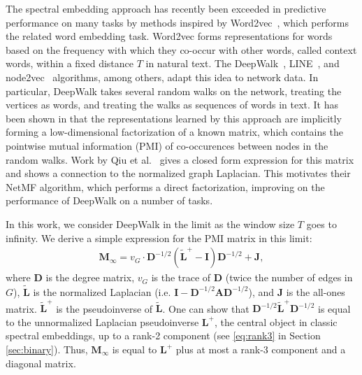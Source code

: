 \documentclass[sigconf]{acmart}
\newcommand{\mbf}[1]{\mathbf{#1}}
\newcommand{\bv}[1]{\mathbf{#1}}
\begin{document}
The spectral embedding approach has recently been exceeded in predictive performance on many tasks by methods inspired by Word2vec~\cite{mikolov2013distributed}, which performs the related word embedding task.
Word2vec forms representations for words based on the frequency with which they co-occur with other words, called context words, within a fixed distance $T$ in natural text. The DeepWalk~\cite{perozzi2014deepwalk}, LINE~\cite{tang2015line}, and node2vec~\cite{grover2016node2vec} algorithms, among others, adapt this idea to network data. In particular, DeepWalk takes several random walks on the network, treating the vertices as words, and treating the walks as sequences of words in text.
It has been shown in \cite{levy2014neural} that the representations learned by this approach are implicitly forming a low-dimensional factorization of a known matrix, which contains the pointwise mutual information (PMI) of co-occurences between nodes in the random walks.
Work by Qiu et al.~\cite{qiu2018network} gives  a closed form expression for this matrix and shows a connection to the normalized graph Laplacian. This motivates their NetMF algorithm, which performs a direct factorization, improving on the performance of DeepWalk on a number of tasks.

In this work, we consider DeepWalk in the limit as the window size $T$ goes to infinity.
We derive a simple expression for the PMI matrix in this limit:
%
\begin{align}\label{eq:simple}
\bv{M_\infty} = v_G \cdot \mbf{D}^{-1/2} \left( \mbf{\tilde{L}}^+ - \mbf{I} \right) \mbf{D}^{-1/2} + \mbf{J},
\end{align}
%
where $\mbf{D}$ is the degree matrix, $v_G$ is the trace of $\mbf{D}$ (twice the number of edges in $G$), $\mbf{\tilde{L}}$ is the normalized Laplacian (i.e. $\mbf{I} - \mbf{D}^{-1/2}\mbf{A} \mbf{D}^{-1/2}$), and $\mbf{J}$ is the all-ones matrix. $\mbf{\tilde{L}}^+$ is the pseudoinverse of $\mbf{\tilde{L}}$. One can  show that $\mbf{D}^{-1/2}\mbf{\tilde{L}}^+ \mbf{D}^{-1/2}$ is equal to the unnormalized Laplacian pseudoinverse $\mbf{L}^+$, the central object in classic spectral embeddings, up to a rank-2 component (see \eqref{eq:rank3} in Section \ref{sec:binary}). Thus, $\bv{M_\infty}$ is equal to $\mbf{L}^+$ plus at most a rank-3 component and a diagonal matrix.
\end{document}
